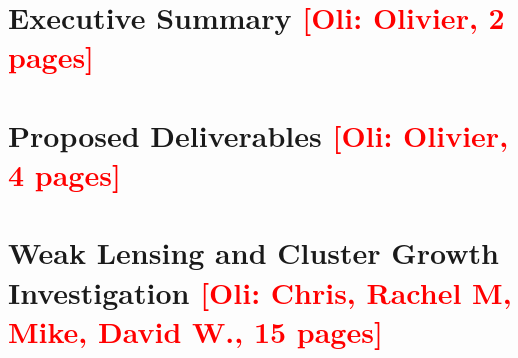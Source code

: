 \documentclass[letter]{ar-1col_WFIRST-HLS}
\newcommand{\Oli}[1]{\textcolor{red}{[{\bf Oli}: #1]}}
\begin{document}




\tableofcontents
\thispagestyle{empty}

\newpage
{}

\section{Executive Summary \Oli{Olivier, 2 pages}}
\label{sec:executive_summary}



\section{Proposed Deliverables \Oli{Olivier, 4 pages}}
\label{sec:deliverables}


%

\section{Weak Lensing and Cluster Growth Investigation \Oli{Chris,
    Rachel M, Mike, David W., 15 pages}}
\label{sec:wl_gal-clusters}

\end{document}
